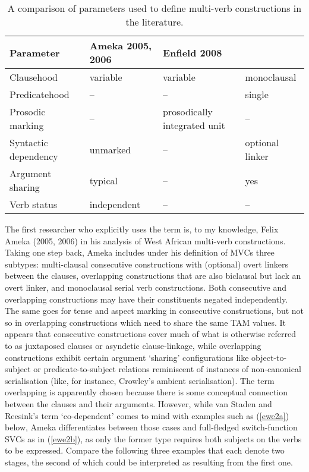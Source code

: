 \begin{table}

\begin{tabular}{l L{3cm} L{3cm} L{3cm}}
\hline \textbf{Parameter} & \textbf{Ameka 2005, 2006} & \textbf{Enfield 2008} & \textbf{\cite{Aikhenvald2011}} \\
\hline Clausehood & variable & variable & monoclausal \\
Predicatehood & -- & -- & single \\
Prosodic marking & -- & prosodically integrated unit & -- \\
Syntactic dependency & unmarked & -- & optional linker \\
Argument sharing & typical & -- & yes \\
Verb status & independent & -- & -- \\
\hline
\end{tabular}
\caption[Parameters used to define multi-verb constructions]{A comparison of parameters used to define multi-verb constructions in the literature.}
\label{table:multi-verb}

\end{table}

The first researcher who explicitly uses the term is, to my knowledge, Felix Ameka (2005, 2006) in his analysis of West African multi-verb constructions. Taking one step back, Ameka includes under his definition of MVCs three subtypes: multi-clausal consecutive constructions with (optional) overt linkers between the clauses, overlapping constructions that are also biclausal but lack an overt linker, and monoclausal serial verb constructions. Both consecutive and overlapping constructions may have their constituents negated independently. The same goes for tense and aspect marking in consecutive constructions, but not so in overlapping constructions which need to share the same TAM values. It appears that consecutive constructions cover much of what is otherwise referred to as juxtaposed clauses or asyndetic clause-linkage, while overlapping constructions exhibit certain argument `sharing' configurations like object-to-subject or predicate-to-subject relations reminiscent of instances of non-canonical serialisation (like, for instance, Crowley's ambient serialisation). The term overlapping is apparently chosen because there is some conceptual connection between the clauses and their arguments. However, while van Staden and Reesink's term `co-dependent' comes to mind with examples such as (\ref{ewe2a}) below, Ameka differentiates between those cases and full-fledged switch-function SVCs as in (\ref{ewe2b}), as only the former type requires both subjects on the verbs to be expressed. Compare the following three examples that each denote two stages, the second of which could be interpreted as resulting from the first one. 

